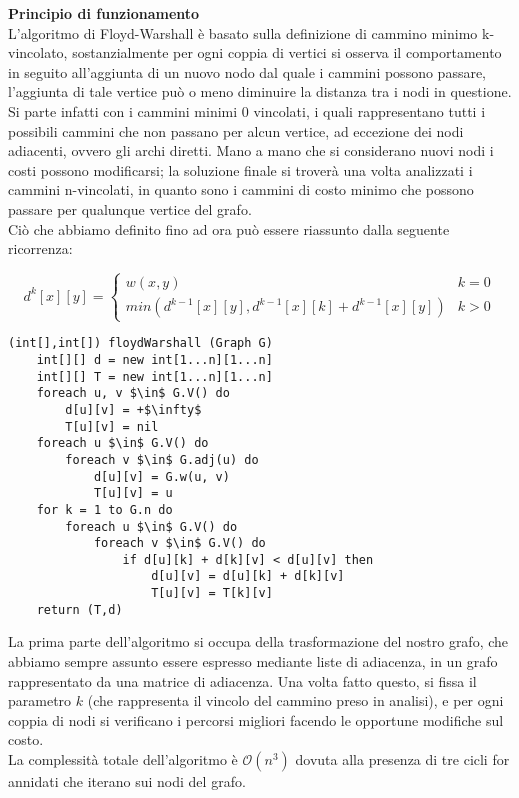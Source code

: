\documentclass[../cheatSheetAlgoritmi.tex]{subfiles}
\begin{document}
\bigskip
\textbf{Principio di funzionamento} \\
L'algoritmo di Floyd-Warshall è basato sulla definizione di cammino minimo k-vincolato, sostanzialmente per ogni coppia di vertici si osserva il comportamento in seguito all'aggiunta di un nuovo nodo dal quale i cammini possono passare, l'aggiunta di tale vertice può o meno diminuire la distanza tra i nodi in questione. Si parte infatti con i cammini minimi 0 vincolati, i quali rappresentano tutti i possibili cammini che non passano per alcun vertice, ad eccezione dei nodi adiacenti, ovvero gli archi diretti. Mano a mano che si considerano nuovi nodi i costi possono modificarsi; la soluzione finale si troverà  una volta analizzati i cammini n-vincolati, in quanto sono i cammini di costo minimo che possono passare per qualunque vertice del grafo. \\
Ciò che abbiamo definito fino ad ora può essere riassunto dalla seguente ricorrenza: 

\[
  d^{k}[x][y]=\begin{cases}
               w(x, y) & k = 0\\
               min(d^{k-1}[x][y], d^{k-1}[x][k] + d^{k-1}[x][y]) & k > 0
            \end{cases}
\]
\begin{lstlisting}[caption=Algoritmo di Floyd e Warshall cammini minimi a sorgente multipla]
(int[],int[]) floydWarshall (Graph G)
	int[][] d = new int[1...n][1...n]
	int[][] T = new int[1...n][1...n]
	foreach u, v $\in$ G.V() do
		d[u][v] = +$\infty$
		T[u][v] = nil
	foreach u $\in$ G.V() do
		foreach v $\in$ G.adj(u) do
			d[u][v] = G.w(u, v)
			T[u][v] = u
	for k = 1 to G.n do
		foreach u $\in$ G.V() do
			foreach v $\in$ G.V() do
				if d[u][k] + d[k][v] < d[u][v] then
					d[u][v] = d[u][k] + d[k][v]
					T[u][v] = T[k][v]
	return (T,d)
\end{lstlisting}
La prima parte dell'algoritmo si occupa della trasformazione del nostro grafo, che abbiamo sempre assunto essere espresso mediante liste di adiacenza, in un grafo rappresentato da una matrice di adiacenza. Una volta fatto questo, si fissa il parametro $k$ (che rappresenta il vincolo del cammino preso in analisi), e per ogni coppia di nodi si verificano i percorsi migliori facendo le opportune modifiche sul costo. \\
La complessità totale dell'algoritmo è $\mathcal{O}(n^3)$ dovuta alla presenza di tre cicli for annidati che iterano sui nodi del grafo.
 
\end{document}
